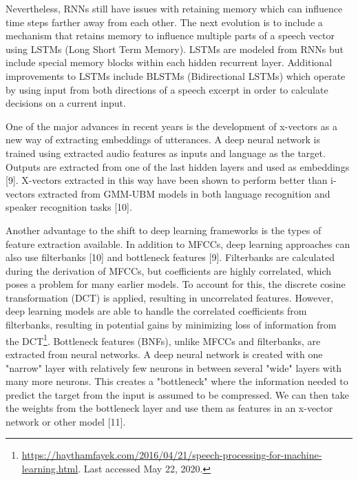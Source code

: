 \documentclass{llncs}
\begin{document}
Nevertheless, RNNs still have issues with retaining memory which can influence time steps farther away from each other.  The next evolution is to include a mechanism that retains memory to influence multiple parts of a speech vector using  LSTMs (Long Short Term Memory).  LSTMs are modeled from RNNs but include special memory blocks within each hidden recurrent layer.  Additional improvements to LSTMs include BLSTMs (Bidirectional LSTMs) which operate by using input from both directions of a speech excerpt in order to calculate decisions on a current input.

One of the major advances in recent years is the development of x-vectors as a new way of extracting embeddings of utterances. A deep neural network is trained using extracted audio features as inputs and language as the target. Outputs are extracted from one of the last hidden layers and used as embeddings [9]. X-vectors extracted in this way have been shown to perform better than i-vectors extracted from GMM-UBM models in both language recognition and speaker recognition tasks [10].

Another advantage to the shift to deep learning frameworks is the types of feature extraction available. In addition to MFCCs, deep learning approaches can also use filterbanks [10] and bottleneck features [9]. Filterbanks are calculated during the derivation of MFCCs, but coefficients are highly correlated, which poses a problem for many earlier models. To account for this, the discrete cosine transformation (DCT) is applied, resulting in uncorrelated features. However, deep learning models are able to handle the correlated coefficients from filterbanks, resulting in potential gains by minimizing loss of information from the DCT\footnote{\url{https://haythamfayek.com/2016/04/21/speech-processing-for-machine-learning.html}. Last accessed May 22, 2020.}. Bottleneck features (BNFs), unlike MFCCs and filterbanks, are extracted from neural networks. A deep neural network is created with one "narrow" layer with relatively few neurons in between several "wide" layers with many more neurons. This creates a "bottleneck" where the information needed to predict the target from the input is assumed to be compressed. We can then take the weights from the bottleneck layer and use them as features in an x-vector network or other model [11].
\end{document}
